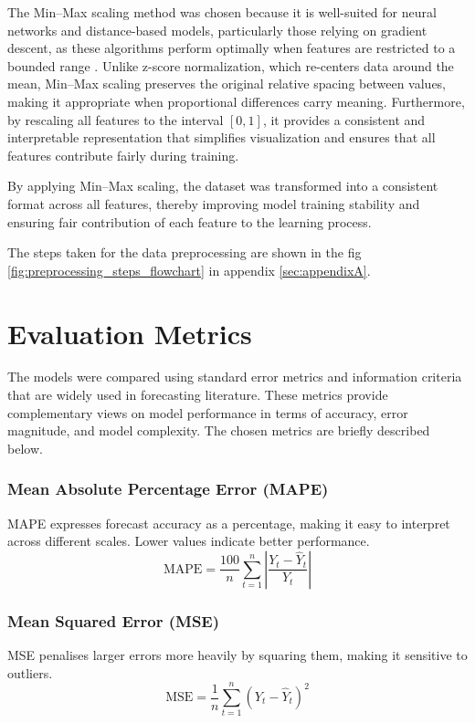 The Min–Max scaling method was chosen because it is well-suited for neural networks and distance-based models, particularly those relying on gradient descent, as these algorithms perform optimally when features are restricted to a bounded range \cite{featureScaling}. Unlike z-score normalization, which re-centers data around the mean, Min–Max scaling preserves the original relative spacing between values, making it appropriate when proportional differences carry meaning. Furthermore, by rescaling all features to the interval \([0,1]\), it provides a consistent and interpretable representation that simplifies visualization and ensures that all features contribute fairly during training.

By applying Min–Max scaling, the dataset was transformed into a consistent format across all features, thereby improving model training stability and ensuring fair contribution of each feature to the learning process.


The steps taken for the data preprocessing are shown in the fig \ref{fig:preprocessing_steps_flowchart} in appendix   \ref{sec:appendixA}. 

\section{Evaluation Metrics \label{sec:eval_metrics}}
The models were compared using standard error metrics and information criteria that are widely used in forecasting literature. These metrics provide complementary views on model performance in terms of accuracy, error magnitude, and model complexity. The chosen metrics are briefly described below. 

\subsubsection{Mean Absolute Percentage Error (MAPE)} 
MAPE expresses forecast accuracy as a percentage, making it easy to interpret across different scales. Lower values indicate better performance.  
\[
\text{MAPE} = \frac{100}{n}\sum_{t=1}^{n} \left| \frac{Y_t - \hat{Y}_t}{Y_t} \right|
\tag{6}
\]

\subsubsection{Mean Squared Error (MSE)} 
MSE penalises larger errors more heavily by squaring them, making it sensitive to outliers.  
\[
\text{MSE} = \frac{1}{n}\sum_{t=1}^{n} (Y_t - \hat{Y}_t)^2
\tag{7}
\]

